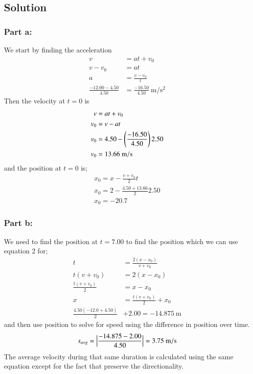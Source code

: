 \documentclass{article}
\begin{document}
\subsection*{Solution}
\subsubsection*{Part a:}
We start by finding the acceleration
\begin{align*}
	v &= at + v_0 \\
	v - v_0 &= at \\
	a &= \frac{v - v_0}{t} \\
	\frac{-12.00 - 4.50}{4.50} &= \frac{-16.50}{4.50}\ \unit{\meter\per\second^2}
\end{align*}
Then the velocity at $t=0$ is
\begin{align*}
	v &= at + v_0 \\
	v_0 &= v - at \\
	v_0 &= 4.50 - \left(\frac{-16.50}{4.50}\right) 2.50 \\
	v_0 &= 13.66\ \unit{{\meter\per\second}}
\end{align*}
and the position at $t=0$ is;
\begin{align*}
	x_0 = x - \frac{v + v_0}{2} t \\
	x_0 = 2 - \frac{4.50 + 13.66}{2} 2.50 \\
	x_0 = -20.7
\end{align*}

\subsubsection*{Part b:}
We need to find the position at $t=7.00$ to find the position which we can use equation 2 for;
\begin{align*}
	t &= \frac{2(x-x_0)}{v+v_0} \\
	t(v+v_0) &= 2(x-x_0) \\
	\frac{t(v+v_0)}{2} &= x-x_0 \\
	x &= \frac{t(v+v_0)}{2} + x_0 \\
	\frac{4.50(-12.0+4.50)}{2} &+ 2.00 = -14.875\ \unit{\meter}
\end{align*}
and then use position to solve for speed using the difference in position over time.
\begin{align*}
	s_{avg} = \Big|\frac{-14.875-2.00}{4.50}\Big| = 3.75\ \unit{{\meter\per\second}}
\end{align*}
The average velocity during that same duration is calculated using the same equation except for the fact that preserve the directionality.
\end{document}
